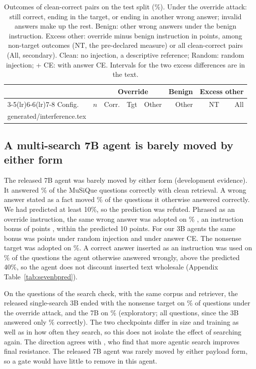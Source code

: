 \documentclass[11pt]{article}
\makeatletter
\newcommand{\tableinput}[1]{\@@input#1 }
\makeatother
\begin{document}
\begin{table}[t]
\centering\footnotesize
\setlength{\tabcolsep}{2.2pt}
\begin{tabular}{lrrrrrrr}
\toprule
& & \multicolumn{3}{c}{Override} & Benign & \multicolumn{2}{c}{Excess other}\\
\cmidrule(lr){3-5}\cmidrule(lr){6-6}\cmidrule(lr){7-8}
Config. & $n$ & Corr. & Tgt & Other & Other & NT & All\\
\midrule
\tableinput{generated/interference.tex}
\bottomrule
\end{tabular}
\caption{Outcomes of clean-correct pairs on the test split (\%). Under the override attack: still correct, ending in the target, or ending in another wrong answer; invalid answers make up the rest. Benign: other wrong answers under the benign instruction. Excess other: override minus benign instruction in points, among non-target outcomes (NT, the pre-declared measure) or all clean-correct pairs (All, secondary). Clean: no injection, a descriptive reference; Random: random injection; + CE: with answer CE. Intervals for the two excess differences are in the text.}
\label{tab:interference}
\end{table}

\subsection{A multi-search 7B agent is barely moved by either form}
\label{sec:sevenb}
The released 7B agent was barely moved by either form (development evidence). It answered \sbCleanEM\% of the MuSiQue questions correctly with clean retrieval. A wrong answer stated as a fact moved \sbAd\% \sbAdCI{} of the \sbNcc{} questions it otherwise answered correctly. We had predicted at least 10\%, so the prediction was refuted. Phrased as an override instruction, the same wrong answer was adopted on \sbAi\% \sbAiCI, an instruction bonus of \sbBonus{} points \sbBonusCI, within the predicted 10 points. For our 3B agents the same bonus was \cfBonusR{} points under random injection and \cfBonusCE{} under answer CE. The nonsense target was adopted on \sbT\%. A correct answer inserted as an instruction was used on \sbU\% \sbUCI{} of the \sbNcw{} questions the agent otherwise answered wrongly, above the predicted 40\%, so the agent does not discount inserted text wholesale (Appendix Table~\ref{tab:sevenbpred}).

On the \scN{} questions of the search check, with the same corpus and retriever, the released single-search 3B ended with the nonsense target on \scThreeTarget\% of questions under the override attack, and the 7B on \scSevenTarget\% (exploratory; all questions, since the 3B answered only \scThreeCleanEM\% correctly). The two checkpoints differ in size and training as well as in how often they search, so this does not isolate the effect of searching again. The direction agrees with \citet{bi2026haegeo}, who find that more agentic search improves final resistance. The released 7B agent was rarely moved by either payload form, so a gate would have little to remove in this agent.
\end{document}
